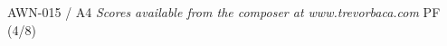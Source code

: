 \documentclass[11pt]{report}
\begin{document}
\null \vfill

AWN-015 / A4 \hfill
\textit{Scores available from the composer at www.trevorbaca.com}
\hfill PF (4/8)
\end{document}
